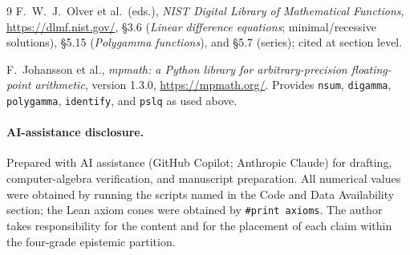 \documentclass[11pt]{article}
\begin{document}
\begin{thebibliography}{9}
F.~W.~J.~Olver et al.\ (eds.),
\emph{NIST Digital Library of Mathematical Functions},
\url{https://dlmf.nist.gov/}, \S3.6 (\emph{Linear difference equations}; minimal/recessive
solutions), \S5.15 (\emph{Polygamma functions}), and \S5.7 (series); cited at section level.

F.~Johansson et al.,
\emph{mpmath: a Python library for arbitrary-precision floating-point arithmetic},
version 1.3.0, \url{https://mpmath.org/}. Provides \texttt{nsum}, \texttt{digamma},
\texttt{polygamma}, \texttt{identify}, and \texttt{pslq} as used above.

\end{thebibliography}

\paragraph{AI-assistance disclosure.}
Prepared with AI assistance (GitHub Copilot; Anthropic Claude) for drafting,
computer-algebra verification, and manuscript preparation. All numerical values were
obtained by running the scripts named in the Code and Data Availability section; the
Lean axiom cones were obtained by \texttt{\#print axioms}. The author takes
responsibility for the content and for the placement of each claim within the
four-grade epistemic partition.
\end{document}
